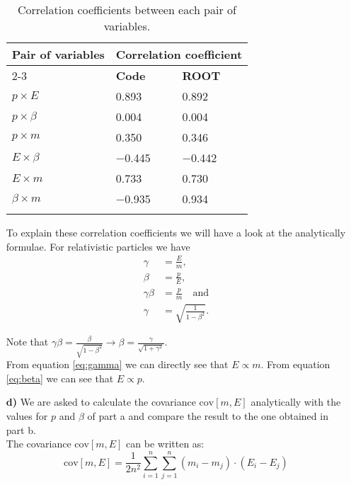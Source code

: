 \documentclass[10pt]{article}
\newenvironment{myfont}{\fontfamily{put}\selectfont}{\par}
\begin{document}
\begin{myfont}
\begin{itemize}
    \begin{longtable}{*{3}l}
      \caption[]{Correlation coefficients between each pair of variables. \\ }
      \endfirsthead
      \endhead
      \toprule
      \multirow{2}{*}{\textbf{Pair of variables}} & \multicolumn{2}{c}{\textbf{Correlation coefficient}} \\
      \cmidrule(lr){2-3}
       & \textbf{Code} & \textbf{ROOT} \\
      \midrule
      $p \times E$     & \num{0.893}  & \num{0.892} \\
      $p \times \beta$ & \num{0.004}  & \num{0.004} \\
      $p \times m$     & \num{0.350}  & \num{0.346} \\
      $E \times \beta$ & \num{-0.445} & \num{-0.442} \\
      $E \times m$     & \num{0.733}  & \num{0.730} \\
      $\beta \times m$ & \num{-0.935} & \num{0.934} \\
      \bottomrule
      \label{tab:ex_c_coefficients}
    \end{longtable}

    \noindent To explain these correlation coefficients we will have a look at the analytically formulae.
    For relativistic particles we have
    \begin{align}
      \gamma      & = \frac{E}{m}, \label{eq:gamma}\\
      \beta       & = \frac{p}{E}, \label{eq:beta}\\
      \gamma\beta & = \frac{p}{m} \quad \textrm{and} \label{eq:gammabeta}\\
      \gamma      & = \sqrt{\frac{1}{1 - \beta^{2}}}. \label{eq:gamma2}
    \end{align}

    \noindent Note that $\gamma\beta = \frac{\beta}{\sqrt{1-\beta^{2}}} \rightarrow \beta = \frac{\gamma}{\sqrt{1 + \gamma^{2}}}$. \\

    \noindent From equation \ref{eq:gamma} we can directly see that $E \propto m$.
    From equation \ref{eq:beta} we can see that $E \propto p$.

  \item[\textbf{d)}] \label{part_d}
    We are asked to calculate the covariance $\textrm{cov}[m, E]$ analytically with the values for $p$ and $\beta$ of part a and compare the result to the one obtained in part b.\\
   The covariance $\textrm{cov}[m, E]$ can be written as:
   \begin{equation}
   \textrm{cov}[m, E] = \frac{1}{2n^2} \sum_{i=1}^n \sum_{j=1}^n (m_i - m_j) \cdot (E_i - E_j)
   \end{equation}


\end{itemize}
\end{myfont}
\end{document}
